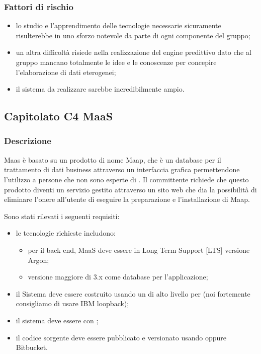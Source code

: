 \documentclass[12pt,a4paper]{article}
\begin{document}
\subsubsection{Fattori di rischio}

\begin{itemize}
\item lo studio e l'apprendimento delle tecnologie necessarie sicuramente risulterebbe in uno sforzo notevole da parte di ogni componente del gruppo;
\item un altra difficoltà risiede nella realizzazione del engine predittivo dato che al gruppo mancano totalmente le idee e le conoscenze per concepire l'elaborazione di dati eterogenei;
\item il sistema da realizzare sarebbe incredibilmente ampio.
\end{itemize}

\newpage
\subsection{Capitolato C4 MaaS}
\subsubsection{Descrizione}
Maas è basato su un prodotto di nome Maap, che è un database  per il trattamento di dati business attraverso un interfaccia grafica permettendone l'utilizzo a persone che non sono esperte di . Il committente richiede che questo prodotto diventi un servizio gestito attraverso un sito web che dia la possibilità di eliminare l'onere all'utente di eseguire la preparazione e l'installazione di Maap.

Sono stati rilevati i seguenti requisiti:

\begin{itemize}

\item le tecnologie richieste includono:

\begin{itemize}
\item {} per il back end, MaaS deve essere in Long Term Support [LTS] versione Argon;
\item {} versione maggiore di 3.x come database per l'applicazione; 
\end{itemize}

\item il Sistema deve essere costruito usando un  di alto livello per  (noi fortemente consigliamo di usare IBM loopback);

\item il sistema deve essere  con ;
 
\item il codice sorgente deve essere pubblicato e versionato usando  oppure Bitbucket. 

\end{itemize}
\end{document}
